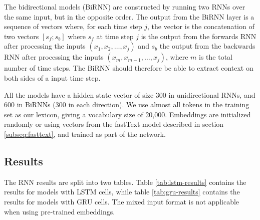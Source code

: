 The bidirectional models (BiRNN) are constructed by running two \acp{RNN} over
the same input, but in the opposite order. The output from the BiRNN layer is
a sequence of vectors where, for each time step $j$, the vector is the
concatenation of two vectors $[s_f;s_b]$ where $s_f$ at time step $j$ is the
output from the forwards \ac{RNN} after processing the inputs $(x_1, x_2,
\ldots, x_j)$ and $s_b$ the output from the backwards \ac{RNN} after
processing the inputs $(x_m, x_{m-1}, \ldots, x_j)$, where $m$ is the total
number of time steps. The BiRNN should therefore be able to extract context
on both sides of a input time step.

All the models have a hidden state vector of size 300 in unidirectional
\acp{RNN}, and 600 in BiRNNs (300 in each direction). We use almost all
tokens in the training set as our lexicon, giving a vocabulary size of
20,000. Embeddings are initialized randomly or using vectors from the
fastText model described in section \ref{subseq:fasttext}, and trained as
part of the network.


\subsection{Results}

The RNN results are split into two tables. Table \ref{tab:lstm-results}
contains the results for models with \ac{LSTM} cells, while table
\ref{tab:gru-results} contains the results for models with \ac{GRU} cells.
The mixed input format is not applicable when using pre-trained embeddings.

